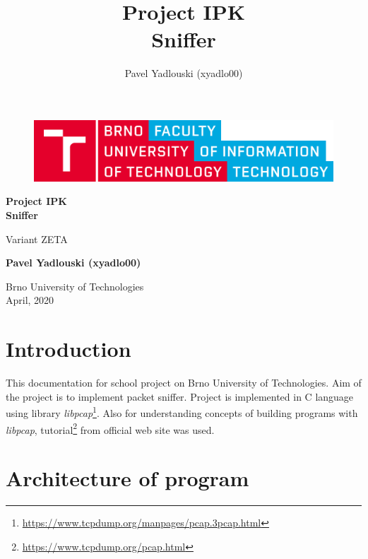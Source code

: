 \documentclass[12pt,a4paper]{article}
\title{Project IPK \\
Sniffer}
\author{Pavel Yadlouski (xyadlo00)}
\begin{document}
\begin{titlepage}
   \begin{center}
       \vspace*{1cm}
       \Large{ 
           \begin{figure}
               \centering
               \includegraphics[width=\textwidth,height=\textheight,keepaspectratio]{VUT-FIT-logo-en.png}
           \end{figure}

           \textbf{Project IPK\\Sniffer}
           
           \vspace{0.5cm}
           Variant ZETA
           
           \vspace{1.5cm}
           
           \textbf{Pavel Yadlouski (xyadlo00)}
           
           \vfill
        }
           
           
           \vspace{0.8cm}
     
       Brno University of Technologies\\
       April, 2020
            
   \end{center}
\end{titlepage}

\section*{Introduction}

This documentation for school project on Brno University of Technologies. Aim of 
the project is to implement packet sniffer. Project is implemented in C language 
using library \textit{libpcap}\footnote{\url{https://www.tcpdump.org/manpages/pcap.3pcap.html}}.
Also for understanding concepts of building programs with   \textit{libpcap}, 
tutorial\footnote{\url{https://www.tcpdump.org/pcap.html}} from official web 
site was used.
\section{Architecture of program}
\end{document}
